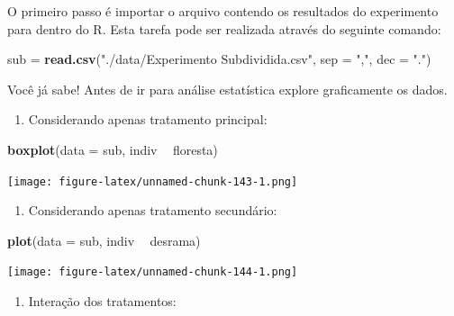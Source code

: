 \documentclass[
]{article}
\newenvironment{Shaded}{\begin{snugshade}}{\end{snugshade}}
\newcommand{\DataTypeTok}[1]{\textcolor[rgb]{0.13,0.29,0.53}{#1}}
\newcommand{\KeywordTok}[1]{\textcolor[rgb]{0.13,0.29,0.53}{\textbf{#1}}}
\newcommand{\NormalTok}[1]{#1}
\newcommand{\OperatorTok}[1]{\textcolor[rgb]{0.81,0.36,0.00}{\textbf{#1}}}
\newcommand{\StringTok}[1]{\textcolor[rgb]{0.31,0.60,0.02}{#1}}
\providecommand{\tightlist}{%
  \setlength{\itemsep}{0pt}\setlength{\parskip}{0pt}}
\begin{document}
O primeiro passo é importar o arquivo contendo os resultados do experimento para dentro do R. Esta tarefa pode ser realizada através do seguinte comando:

\begin{Shaded}
\begin{Highlighting}[]
\NormalTok{sub =}\StringTok{ }\KeywordTok{read.csv}\NormalTok{(}\StringTok{"./data/Experimento Subdividida.csv"}\NormalTok{, }
               \DataTypeTok{sep =} \StringTok{","}\NormalTok{, }\DataTypeTok{dec =} \StringTok{"."}\NormalTok{)}
\end{Highlighting}
\end{Shaded}

Você já sabe! Antes de ir para análise estatística explore graficamente os dados.

\begin{enumerate}
\def\labelenumi{\arabic{enumi}.}
\tightlist
\item
  Considerando apenas tratamento principal:
\end{enumerate}

\begin{Shaded}
\begin{Highlighting}[]
\KeywordTok{boxplot}\NormalTok{(}\DataTypeTok{data =}\NormalTok{ sub, indiv }\OperatorTok{~}\StringTok{ }\NormalTok{floresta)}
\end{Highlighting}
\end{Shaded}

\texttt{[image: figure-latex/unnamed-chunk-143-1.png]}

\begin{enumerate}
\def\labelenumi{\arabic{enumi}.}
\setcounter{enumi}{1}
\tightlist
\item
  Considerando apenas tratamento secundário:
\end{enumerate}

\begin{Shaded}
\begin{Highlighting}[]
\KeywordTok{plot}\NormalTok{(}\DataTypeTok{data =}\NormalTok{ sub, indiv }\OperatorTok{~}\StringTok{ }\NormalTok{desrama)}
\end{Highlighting}
\end{Shaded}

\texttt{[image: figure-latex/unnamed-chunk-144-1.png]}

\begin{enumerate}
\def\labelenumi{\arabic{enumi}.}
\setcounter{enumi}{2}
\tightlist
\item
  Interação dos tratamentos:
\end{enumerate}
\end{document}
